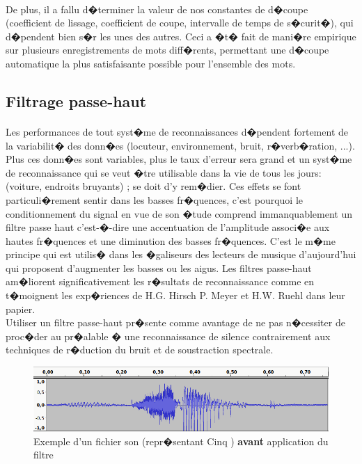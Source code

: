 \paragraph{}
	De plus, il a fallu d�terminer la valeur de nos constantes de d�coupe (coefficient de lissage, coefficient de coupe, intervalle de temps de s�curit�), 
	qui d�pendent bien s�r les unes des autres. Ceci a �t� fait de mani�re empirique sur plusieurs enregistrements de mots diff�rents, permettant une d�coupe automatique la plus satisfaisante possible pour l'ensemble des mots.
    \subsection{Filtrage passe-haut}
\paragraph{}
	Les performances de tout syst�me de reconnaissances d�pendent fortement de la variabilit� 
	des donn�es (locuteur, environnement, bruit, r�verb�ration, ...). Plus ces donn�es sont variables, 
	plus le taux d'erreur sera grand et un syst�me de reconnaissance qui se veut �tre utilisable dans la vie de tous les jours: 
	(voiture, endroits bruyants) ; se doit d'y rem�dier. Ces effets se font particuli�rement sentir dans les basses fr�quences, 
	c'est pourquoi le conditionnement du signal en vue de son �tude comprend immanquablement un filtre passe haut  
	c'est-�-dire une accentuation de l'amplitude associ�e aux hautes fr�quences et une diminution des basses fr�quences. 
	C'est le m�me principe qui est utilis� dans les �galiseurs des lecteurs de musique d'aujourd'hui qui proposent d'augmenter 
	les basses ou les aigus. Les filtres passe-haut am�liorent significativement les r�sultats de reconnaissance comme en 
	t�moignent les exp�riences de H.G. Hirsch P. Meyer et H.W. Ruehl dans leur papier\cite{highpass}.\\
	Utiliser un filtre passe-haut pr�sente comme avantage de ne pas n�cessiter de proc�der au pr�alable 
	� une reconnaissance de silence contrairement aux techniques de r�duction du bruit et de soustraction spectrale.
\begin{figure}[H]
	    \begin{center}
		    \includegraphics[width=15cm]{Images/passehautavant.png} 
	    \end{center}
	    \caption{Exemple d'un fichier son (repr�sentant \og Cinq \fg) \textbf{avant} application du filtre}
\end{figure}
